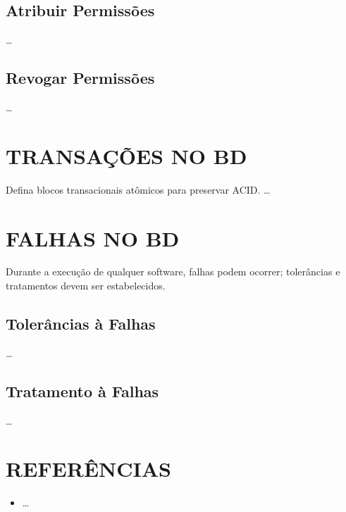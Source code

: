 \documentclass[
12pt,
a4paper,
semrecuonosumario,
sumario = abnt-6027-2012]{report}
\begin{document}
    \section{Atribuir Permissões}
    \dots
    
    \section{Revogar Permissões}
    \dots
    
\chapter{TRANSAÇÕES NO BD}\label{chap:transacoes}
Defina blocos transacionais atômicos para preservar ACID.
\dots

\chapter{FALHAS NO BD}\label{chap:falhas}
Durante a execução de qualquer software, falhas podem ocorrer; tolerâncias e tratamentos devem ser estabelecidos.

    \section{Tolerâncias à Falhas}
    \dots
    
    \section{Tratamento à Falhas}
    \dots

\clearpage
\chapter*{REFERÊNCIAS}
\vspace{-0.5em}
\begin{itemize}
  \item \dots
\end{itemize}
\end{document}
